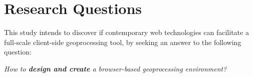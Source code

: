 











\newpage
\section{Research Questions}

This study intends to discover if contemporary web technologies can facilitate a full-scale client-side geoprocessing tool, by seeking an answer to the following question: 

\textit{How to \textbf{design and create} a browser-based geoprocessing environment?}

